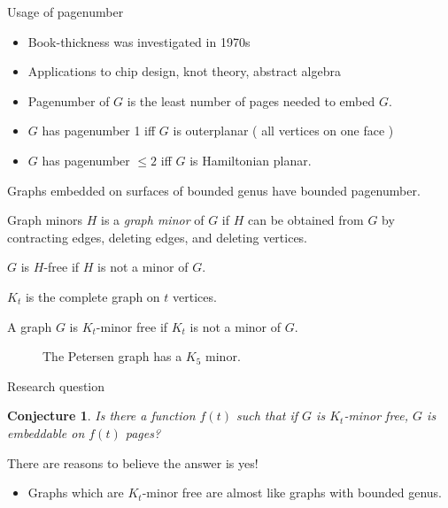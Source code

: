 \documentclass[]{beamer}
\newtheorem{conjecture}[theorem]{Conjecture}
\begin{document}
\begin{frame}{Usage of pagenumber}
	\begin{itemize}
		\item Book-thickness was investigated in 1970s
		\item Applications to chip design, knot theory, abstract algebra
	\end{itemize}
	\begin{itemize}
		\item Pagenumber of $G$ is the least number of pages needed to embed $G$.
		\item $G$ has pagenumber 1 iff $G$ is outerplanar ( all vertices on one face )
		\item $G$ has pagenumber $\leq 2$ iff $G$ is Hamiltonian planar.
	\end{itemize}
	
	\begin{theorem}
		Graphs embedded on surfaces of bounded genus have bounded pagenumber.
	\end{theorem}
\end{frame}

\begin{frame}{Graph minors}
	$H$ is a \textit{graph minor} of $G$ if $H$ can be obtained from $G$ by contracting edges, deleting edges, and deleting vertices.
	
	$G$ is $H$-free if $H$ is not a minor of $G$. 
\end{frame}

\begin{frame}
	$K_t$ is the complete graph on $t$ vertices.
	\begin{definition}
		A graph $G$ is $K_t$-minor free if $K_t$ is not a minor of $G$.
	\end{definition}
	\begin{figure}[h]
		\centering
		
		
		\caption{The Petersen graph has a $K_5$ minor.}\label{P10contraction}
	\end{figure}
\end{frame}

\begin{frame}{Research question}
	\begin{conjecture}
		Is there a function $f(t)$ such that if $G$ is $K_t$-minor free, $G$ is embeddable on $f(t)$ pages?
	\end{conjecture}
	There are reasons to believe the answer is yes!
	\begin{itemize}
		\item Graphs which are $K_t$-minor free are almost like graphs with bounded genus.
	\end{itemize}
\end{frame}
\end{document}
